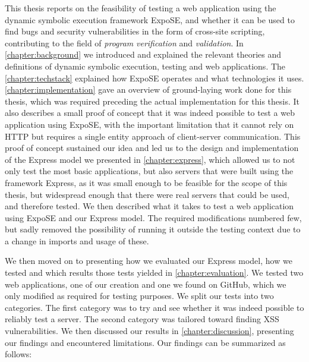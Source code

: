 This thesis reports on the feasibility of testing a web application using the dynamic symbolic execution framework ExpoSE, 
and whether it can be used to find bugs and security vulnerabilities in the form of cross-site scripting, contributing to the field of \textit{program} \textit{verification} and \textit{validation}.
In \autoref{chapter:background} we introduced and explained the relevant theories and definitions of dynamic symbolic execution, testing and web applications.
The \autoref{chapter:techstack} explained how ExpoSE operates and what technologies it uses.
\autoref{chapter:implementation} gave an overview of ground-laying work done for this thesis, which was required preceding the actual implementation for this thesis.
It also describes a small proof of concept that it was indeed possible to test a web application using ExpoSE, with the important limitation that it cannot rely on HTTP but requires a single entity approach of client-server communication.
This proof of concept sustained our idea and led us to the design and implementation of the Express model we presented in \autoref{chapter:express}, which allowed us to not only test the most basic applications,
but also servers that were built using the framework Express, as it was small enough to be feasible for the scope of this thesis, but widespread enough that 
there were real servers that could be used, and therefore tested. We then described what it takes to test a web application using ExpoSE and our Express model. The required modifications numbered few, but sadly removed the possibility of running it outside the testing context due to a change in imports and usage of these.


We then moved on to presenting how we evaluated our Express model, how we tested and which results those tests yielded in \autoref{chapter:evaluation}. We tested two web applications, one of our creation and one we found on GitHub, which we only modified as required for testing purposes. We split our tests into two categories. The first category was to try and see whether it was indeed possible to reliably test a server. The second category was tailored toward finding XSS vulnerabilities.
We then discussed our results in \autoref{chapter:discussion}, presenting our findings and encountered limitations. Our findings can be summarized as follows:


